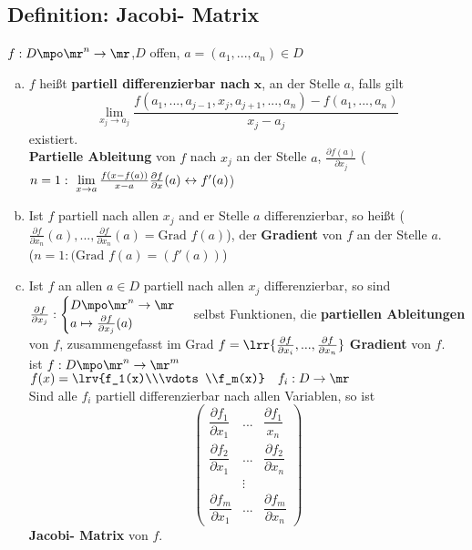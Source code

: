 \subsection{Definition: Jacobi- Matrix}
	$ f:D\mpo\mr^n\rightarrow\mr $,$ D $ offen, $ a=(a_1,...,a_n)\in D $
	\begin{enumerate}[a)]
		\item $ f $ heißt \textbf{partiell differenzierbar nach }$ \mathbf{x} $, an der Stelle $ a $, falls gilt
		\[ \lim\limits_{x_j\rightarrow a_j}\dfrac{f(a_1,...,a_{j-1},x_j,a_{j+1},...,a_n)-f(a_1,...,a_n)}{x_j-a_j} \]
		existiert.\\
		\textbf{Partielle Ableitung} von $ f $ nach $ x_j $ an der Stelle $ a $, $ \frac{\partial f(a)}{\partial x_j} $ ($ n=1:\ \lim\limits_{x\rightarrow a}\frac{f(x-f(a))}{x-a}\\
		\frac{\partial f}{\partial x}(a)\leftrightarrow f'(a)$)
		
		\item  Ist $ f $ partiell nach allen $ x_j $ and er Stelle $ a $ differenzierbar, so heißt ($ \frac{\partial f}{\partial x_n}(a),...,\frac{\partial f}{\partial x_n}(a)=\mbox{Grad }f(a) $), der \textbf{Gradient} von $ f $ an der Stelle $ a $.\\
		($ n=1:(\mbox{Grad }f(a)=(f'(a)) $)
		
		\item  Ist $ f $ an allen $ a\in D $ partiell nach allen $ x_j $ differenzierbar, so sind $ \frac{\partial f}{\partial x_j}:\begin{cases}D\mpo\mr^n\rightarrow\mr\\ a\mapsto\frac{\partial f}{\partial x_j}(a)\end{cases} $ selbst Funktionen, die \textbf{partiellen Ableitungen} von $ f $, zusammengefasst im Grad $ f=\lrr{\frac{\partial f}{\partial x_i},...,\frac{\partial f}{\partial x_n}} $ \textbf{Gradient} von $ f $.\\
		ist $ f:D\mpo\mr^n\rightarrow\mr^m $ $ f(x)=\lrv{f_1(x)\\\vdots\\f_m(x)}\quad f_i:D\rightarrow\mr $\\
		Sind alle $ f_i $ partiell differenzierbar nach allen Variablen, so ist
		\[
		\begin{pmatrix}
		\dfrac{\partial f_1}{\partial x_1}&...&\dfrac{\partial f_1}{x_n}\\
		\dfrac{\partial f_2}{\partial x_1}&...&\dfrac{\partial f_2}{\partial x_n}\\
		&\vdots&\\
		\dfrac{\partial f_m}{\partial x_1}&...&\dfrac{\partial f_m}{\partial x_n}
		\end{pmatrix}
		\]
		\textbf{Jacobi- Matrix} von $ f $.
	\end{enumerate}

